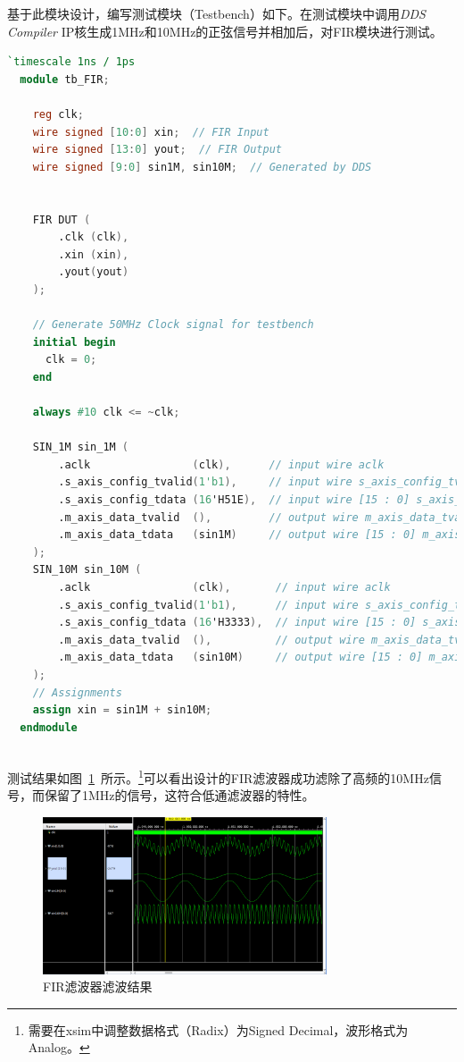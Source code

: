 基于此模块设计，编写测试模块（Testbench）如下。在测试模块中调用\textit{DDS Compiler} IP核生成1MHz和10MHz的正弦信号并相加后，对FIR模块进行测试。
\begin{lstlisting}[language=verilog, caption={Testbench文件}]
  `timescale 1ns / 1ps
  module tb_FIR;
  
    reg clk;
    wire signed [10:0] xin;  // FIR Input
    wire signed [13:0] yout;  // FIR Output
    wire signed [9:0] sin1M, sin10M;  // Generated by DDS
  
  
    FIR DUT (
        .clk (clk),
        .xin (xin),
        .yout(yout)
    );
  
    // Generate 50MHz Clock signal for testbench
    initial begin
      clk = 0;
    end
  
    always #10 clk <= ~clk;
    
    SIN_1M sin_1M (
        .aclk                (clk),      // input wire aclk
        .s_axis_config_tvalid(1'b1),     // input wire s_axis_config_tvalid
        .s_axis_config_tdata (16'H51E),  // input wire [15 : 0] s_axis_config_tdata
        .m_axis_data_tvalid  (),         // output wire m_axis_data_tvalid
        .m_axis_data_tdata   (sin1M)     // output wire [15 : 0] m_axis_data_tdata
    );
    SIN_10M sin_10M (
        .aclk                (clk),       // input wire aclk
        .s_axis_config_tvalid(1'b1),      // input wire s_axis_config_tvalid
        .s_axis_config_tdata (16'H3333),  // input wire [15 : 0] s_axis_config_tdata
        .m_axis_data_tvalid  (),          // output wire m_axis_data_tvalid
        .m_axis_data_tdata   (sin10M)     // output wire [15 : 0] m_axis_data_tdata
    );
    // Assignments
    assign xin = sin1M + sin10M;
  endmodule
  
\end{lstlisting}

测试结果如图~\ref{fig:exp4:result}~所示。\footnote{需要在xsim中调整数据格式（Radix）为Signed Decimal，波形格式为Analog。}可以看出设计的FIR滤波器成功滤除了高频的10MHz信号，而保留了1MHz的信号，这符合低通滤波器的特性。
\begin{figure}[htbp]
  \centering
  \includegraphics[width=0.75\textwidth]{figure/exp4/vivado_waveform.png}
  \caption{FIR滤波器滤波结果}
  \label{fig:exp4:result}
\end{figure}

